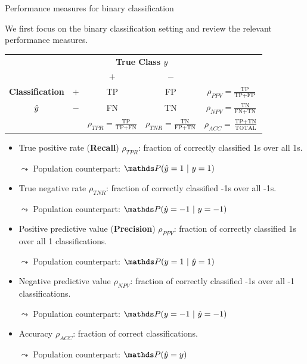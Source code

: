 \documentclass[11pt,compress,t,notes=noshow, xcolor=table]{beamer}
\begin{document}
\begin{vbframe}{Performance measures for binary classification}
%	
\scriptsize{
%	
	We first focus on the binary classification setting and review the relevant performance measures.
%	
	\begin{center}
		\tiny
		\renewcommand{\arraystretch}{1.1}
		\begin{tabular}{cc||cc|c}
			& & \multicolumn{2}{c|}{\bfseries True Class $y$} & \\
			& & $+$ & $-$ & \\ 
			\hline \hline
			\bfseries Classification     & $+$ & TP & FP & $\rho_{PPV} = \frac{\text{TP}}{\text{TP} + \text{FP}}$\\
			$\hat{y}$ & $-$ & FN & TN & $\rho_{NPV} = \frac{\text{TN}}{\text{FN} + \text{TN}}$\\
			\hline
			& & $\rho_{TPR} = \frac{\text{TP}}{\text{TP} + \text{FN}}$ & $\rho_{TNR} = \frac{\text{TN}}{\text{FP} + \text{TN}}$ & $\rho_{ACC} = \frac{\text{TP}+ \text{TN}}{\text{TOTAL}}$
		\end{tabular}
		\renewcommand{\arraystretch}{1}
	\end{center}
%	
	\begin{itemize}
%		
		\item True positive rate (\textbf{Recall}) $\rho_{TPR}$: fraction of correctly classified 1s over all 1s.
%		
		\item [$\leadsto$] Population counterpart: $\P (\yh =1 ~|~ y=1)$
%		
		\item True negative rate $\rho_{TNR}$: fraction of correctly classified -1s over all -1s.
%		
		\item [$\leadsto$] Population counterpart: $\P (\yh = -1 ~|~ y= -1)$
%		
		\item Positive predictive value (\textbf{Precision}) $\rho_{PPV}$: fraction of correctly classified 1s over all 1 classifications.
%		
		\item [$\leadsto$] Population counterpart: $\P (y = 1 ~|~ \yh = 1)$
%		
		\item Negative predictive value $\rho_{NPV}$: fraction of correctly classified -1s over all -1 classifications.
%		
		\item [$\leadsto$] Population counterpart: $\P (y = -1 ~|~ \yh = -1)$
%
		\item Accuracy $\rho_{ACC}$: fraction of correct classifications.
%		
		\item [$\leadsto$] Population counterpart: $\P (\yh = y  )$
	\end{itemize}
}
\end{vbframe}
\end{document}
